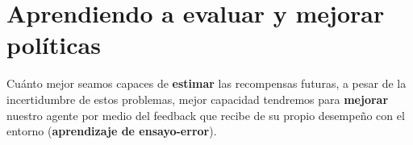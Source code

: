 \documentclass[11pt,fleqn]{book} %
\begin{document}




\section{Aprendiendo a evaluar y mejorar políticas}

Cuánto mejor seamos capaces de \textbf{estimar} las recompensas futuras, a pesar de la incertidumbre de estos problemas, mejor capacidad tendremos para \textbf{mejorar} nuestro agente por medio del feedback que recibe de su propio desempeño con el entorno (\textbf{aprendizaje de ensayo-error}). \\
\end{document}
